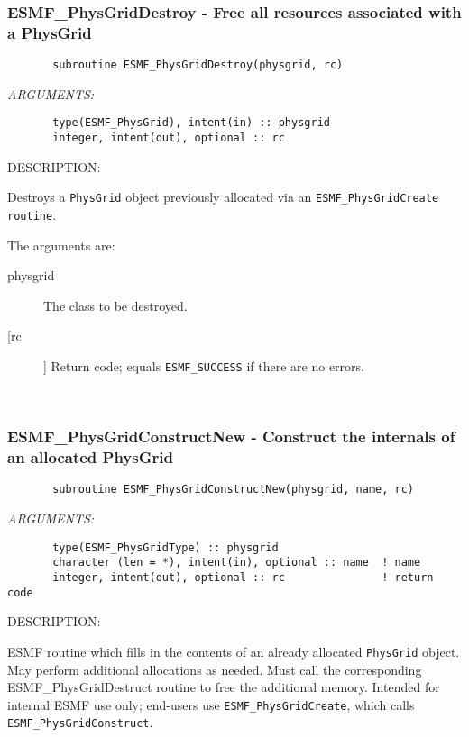 \subsubsection{ESMF\_PhysGridDestroy - Free all resources associated with a PhysGrid }


\begin{verbatim}       subroutine ESMF_PhysGridDestroy(physgrid, rc)\end{verbatim}{\em ARGUMENTS:}
\begin{verbatim}       type(ESMF_PhysGrid), intent(in) :: physgrid   
       integer, intent(out), optional :: rc        \end{verbatim}
{\sf DESCRIPTION:\\ }


       Destroys a {\tt PhysGrid} object previously allocated
       via an {\tt ESMF\_PhysGridCreate routine}.
  
       The arguments are:
       \begin{description}
       \item[physgrid] 
            The class to be destroyed.
       \item[[rc]] 
            Return code; equals {\tt ESMF\_SUCCESS} if there are no errors.
       \end{description}
   
 
\mbox{}\hrulefill\ 
 
\subsubsection{ESMF\_PhysGridConstructNew - Construct the internals of an allocated PhysGrid}


 
\begin{verbatim}       subroutine ESMF_PhysGridConstructNew(physgrid, name, rc)\end{verbatim}{\em ARGUMENTS:}
\begin{verbatim}       type(ESMF_PhysGridType) :: physgrid  
       character (len = *), intent(in), optional :: name  ! name
       integer, intent(out), optional :: rc               ! return code\end{verbatim}
{\sf DESCRIPTION:\\ }


       ESMF routine which fills in the contents of an already
       allocated {\tt PhysGrid} object.  May perform additional allocations
       as needed.  Must call the corresponding ESMF\_PhysGridDestruct
       routine to free the additional memory.  Intended for internal
       ESMF use only; end-users use {\tt ESMF\_PhysGridCreate}, which calls
       {\tt ESMF\_PhysGridConstruct}. 
  
